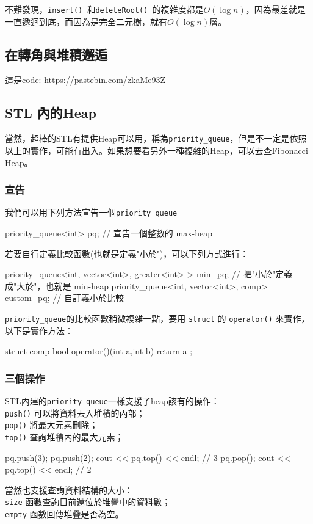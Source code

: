 \documentclass[main.tex]{subfiles}
\begin{document}
不難發現，\texttt{insert() }和\texttt{deleteRoot() }的複雜度都是$O(\log n)$，因為最差就是一直遞迴到底，而因為是完全二元樹，就有$O(\log n)$層。
\subsection{在轉角與堆積邂逅}
這是code: \url{https://pastebin.com/zkaMe93Z}
\subsection{STL 內的Heap}
當然，超棒的STL有提供Heap可以用，稱為\texttt{priority\_queue}，但是不一定是依照以上的實作，可能有出入。如果想要看另外一種複雜的Heap，可以去查Fibonacci Heap。
\subsubsection{宣告}
我們可以用下列方法宣告一個\texttt{priority\_queue}
 \begin{C++}
priority_queue<int> pq; // 宣告一個整數的 max-heap
 \end{C++}
\indent\indent 若要自行定義比較函數(也就是定義"小於")，可以下列方式進行：
 \begin{C++}
priority_queue<int, vector<int>, greater<int> > min_pq;
// 把"小於"定義成"大於"，也就是 min-heap
priority_queue<int, vector<int>, comp> custom_pq; 
// 自訂義小於比較
 \end{C++}
\indent\indent\texttt{priority\_queue}的比較函數稍微複雜一點，要用 \texttt{struct} 的 \texttt{operator()} 來實作，以下是實作方法：
\begin{C++}
struct comp{
    bool operator()(int a,int b){
        return a%
    }
};
\end{C++}
\subsubsection{三個操作}
STL內建的\texttt{priority\_queue}一樣支援了heap該有的操作：\\
\indent\texttt{push()}  可以將資料丟入堆積的內部；\\
\indent\texttt{pop()} 將最大元素刪除；\\
\indent\texttt{top()} 查詢堆積內的最大元素；\\
\begin{C++}
pq.push(3);
pq.push(2);
cout << pq.top() << endl; // 3
pq.pop();
cout << pq.top() << endl; // 2
\end{C++}
\indent\indent 當然也支援查詢資料結構的大小：\\
\indent\texttt{size} 函數查詢目前還位於堆疊中的資料數；\\
\indent\texttt{empty} 函數回傳堆疊是否為空。
\end{document}
